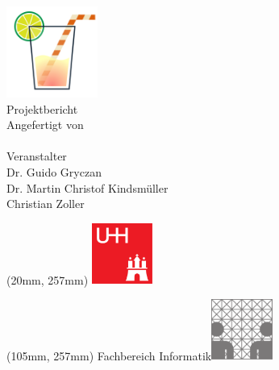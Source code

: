 \makeatletter
\thispagestyle{empty}

\begin{center}
	\textcolor{kiba}{\bf\sffamily\fontsize{48pt}{48pt}\selectfont \@title} \\[.5cm]
	\includegraphics[height=3cm]{logo-kiba} \\[.5cm]
	\textcolor{kiba}{\LARGE\sffamily Projektbericht} \\[.5cm]
    {\large\sffamily Angefertigt von} \\[4pt]
    {\Large \@author \\[1.5cm]}
    {\large\sffamily Veranstalter} \\[12pt]
    {\Large Dr. Guido Gryczan} \\[6pt] {\LARGE Dr. Martin Christof Kindsmüller\vphantom{y}} \\[6pt] {\LARGE Christian Zoller} \\[1.5cm]
    {\Large\sffamily \@date}
\end{center}

\vspace{2.5cm}

\begin{textblock*}{85mm}(20mm, 257mm)
	\includegraphics[width=2cm]{logo-uhh}
\end{textblock*}

\begin{textblock*}{85mm}(105mm, 257mm)
	\hfill{Fachbereich Informatik}\;\includegraphics[width=2cm]{logo-fbi}
\end{textblock*}

\makeatother